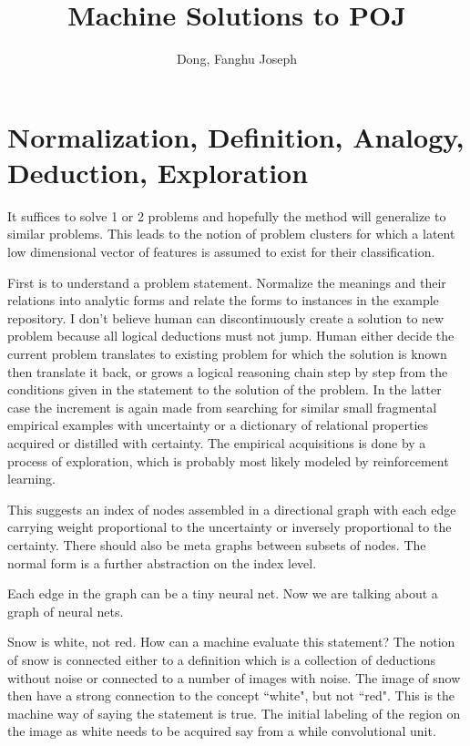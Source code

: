 \documentclass{article}
\title{Machine Solutions to POJ}
\author{Dong, Fanghu Joseph}
\numberwithin{equation}{subsection}
\begin{document}
\maketitle
{}
\section{Normalization, Definition, Analogy, Deduction, Exploration}
	It suffices to solve 1 or 2 problems and hopefully the method will generalize to similar problems. This leads to the notion of problem clusters for which a latent low dimensional vector of features is assumed to exist for their classification.
	
	First is to understand a problem statement. Normalize the meanings and their relations into analytic forms and relate the forms to instances in the example repository. I don't believe human can discontinuously create a solution to new problem because all logical deductions must not jump. Human either decide the current problem translates to existing problem for which the solution is known then translate it back, or grows a logical reasoning chain step by step from the conditions given in the statement to the solution of the problem. In the latter case the increment is again made from searching for similar small fragmental empirical examples with uncertainty or a dictionary of relational properties acquired or distilled with certainty. The empirical acquisitions is done by a process of exploration, which is probably most likely modeled by reinforcement learning.
	
	This suggests an index of nodes assembled in a directional graph with each edge carrying weight proportional to the uncertainty or inversely proportional to the certainty. There should also be meta graphs between subsets of nodes. The normal form is a further abstraction on the index level.
	
	Each edge in the graph can be a tiny neural net. Now we are talking about a graph of neural nets.
	
	Snow is white, not red. How can a machine evaluate this statement? The notion of snow is connected either to a definition which is a collection of deductions without noise or connected to a number of images with noise. The image of snow then have a strong connection to the concept ``white", but not ``red". This is the machine way of saying the statement is true. The initial labeling of the region on the image as white needs to be acquired say from a while convolutional unit. 
	
\end{document}
